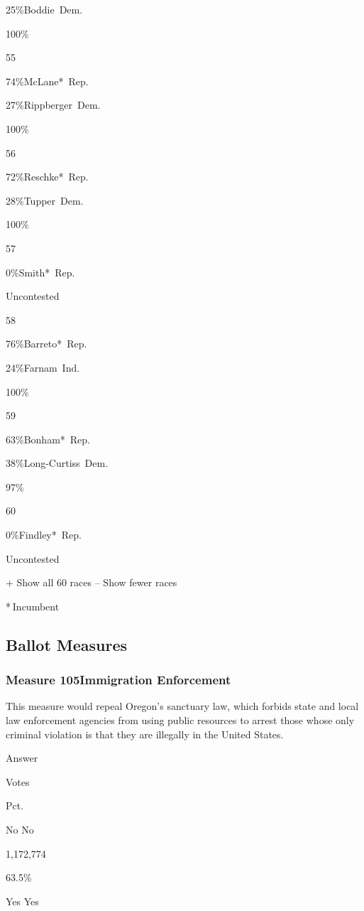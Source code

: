  25\%Boddie~Dem.

100\%

55

 74\%McLane*~Rep.

 27\%Rippberger~Dem.

100\%

56

 72\%Reschke*~Rep.

 28\%Tupper~Dem.

100\%

57

 0\%Smith*~Rep.

Uncontested

58

 76\%Barreto*~Rep.

 24\%Farnam~Ind.

100\%

59

 63\%Bonham*~Rep.

 38\%Long-Curtiss~Dem.

97\%

60

 0\%Findley*~Rep.

Uncontested

+ Show all 60 races -- Show fewer races

* Incumbent~

\hypertarget{ballot-measures}{%
\subsection{Ballot Measures}\label{ballot-measures}}

\hypertarget{measure-105immigration-enforcement}{%
\subsubsection{Measure 105Immigration
Enforcement}\label{measure-105immigration-enforcement}}

This measure would repeal Oregon's sanctuary law, which forbids state
and local law enforcement agencies from using public resources to arrest
those whose only criminal violation is that they are illegally in the
United States.

Answer

Votes

Pct.

 No No

1,172,774

63.5\%

 Yes Yes

